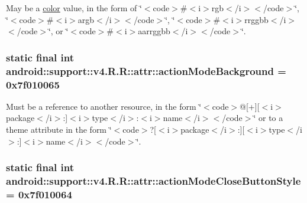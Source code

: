 May be a \hyperlink{classandroid_1_1support_1_1v4_1_1_r_1_1color}{color} value, in the form of \char`\"{}$<$code$>$\#$<$i$>$rgb$<$/i$>$$<$/code$>$\char`\"{}, \char`\"{}$<$code$>$\#$<$i$>$argb$<$/i$>$$<$/code$>$\char`\"{}, \char`\"{}$<$code$>$\#$<$i$>$rrggbb$<$/i$>$$<$/code$>$\char`\"{}, or \char`\"{}$<$code$>$\#$<$i$>$aarrggbb$<$/i$>$$<$/code$>$\char`\"{}. \hypertarget{classandroid_1_1support_1_1v4_1_1_r_1_1attr_a010fbbfc905baa38cb1c179cec94e2f}{
\subsubsection[{actionModeBackground}]{\setlength{\rightskip}{0pt plus 5cm}static final int android::support::v4.R.R::attr::actionModeBackground = 0x7f010065}}
\label{classandroid_1_1support_1_1v4_1_1_r_1_1attr_a010fbbfc905baa38cb1c179cec94e2f}


Must be a reference to another resource, in the form \char`\"{}$<$code$>$@\mbox{[}+\mbox{]}\mbox{[}$<$i$>$package$<$/i$>$:\mbox{]}$<$i$>$type$<$/i$>$:$<$i$>$name$<$/i$>$$<$/code$>$\char`\"{} or to a theme attribute in the form \char`\"{}$<$code$>$?\mbox{[}$<$i$>$package$<$/i$>$:\mbox{]}\mbox{[}$<$i$>$type$<$/i$>$:\mbox{]}$<$i$>$name$<$/i$>$$<$/code$>$\char`\"{}. \hypertarget{classandroid_1_1support_1_1v4_1_1_r_1_1attr_fbdc0ed02b55b971a5cede6c7a27e92a}{
\subsubsection[{actionModeCloseButtonStyle}]{\setlength{\rightskip}{0pt plus 5cm}static final int android::support::v4.R.R::attr::actionModeCloseButtonStyle = 0x7f010064}}
\label{classandroid_1_1support_1_1v4_1_1_r_1_1attr_fbdc0ed02b55b971a5cede6c7a27e92a}


